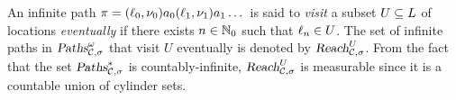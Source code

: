  An infinite path $\infpath=(\loc_0,\nu_0)a_0(\loc_1,\nu_1)a_1\dots$ is said to \emph{visit} a subset $U\subseteq\locs$ of locations \emph{eventually} if there exists $n\in\Nset_0$ such that $\loc_n\in U$. The set of infinite paths in $\infpaths{\pta,\sigma}$ that visit $U$ eventually is denoted by $\omgpaths{\pta,\sigma}{U}$.
From the fact that the set $\fnpaths{\pta,\sigma}$ is countably-infinite, $\omgpaths{\pta,\sigma}{U}$ is measurable since it is a countable union of cylinder sets.





\vspace{-0.8em}
